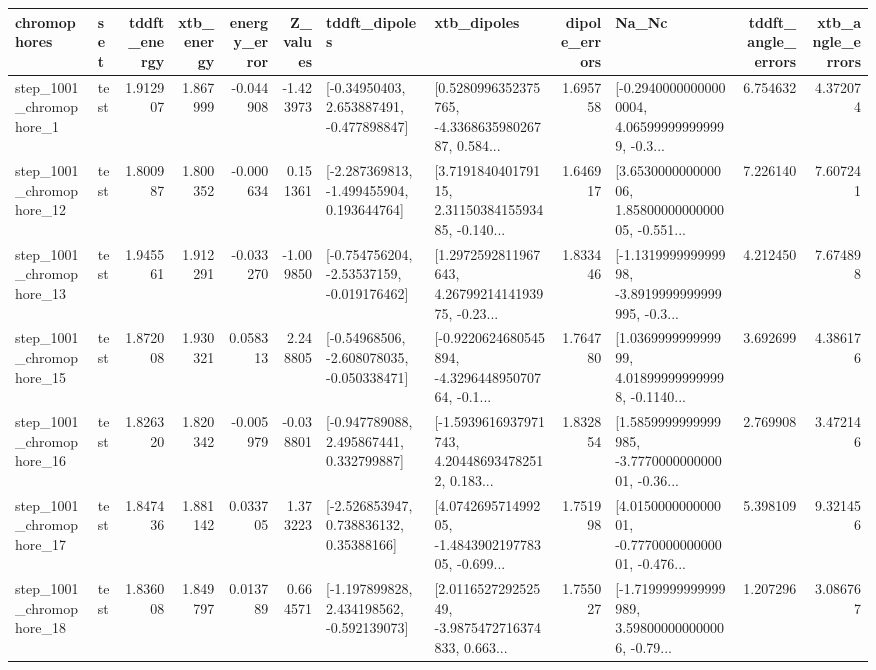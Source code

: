 \begin{tabular}{llrrrrllrlrr}
\toprule
             chromophores &       set &  tddft\_energy &  xtb\_energy &  energy\_error &  Z\_values &                               tddft\_dipoles &                                        xtb\_dipoles &  dipole\_errors &                                              Na\_Nc &  tddft\_angle\_errors &  xtb\_angle\_errors \\
\midrule
  step\_1001\_chromophore\_1 &      test &      1.912907 &    1.867999 &     -0.044908 & -1.423973 &    [-0.34950403, 2.653887491, -0.477898847] &  [0.5280996352375765, -4.336863598026787, 0.584... &       1.695758 &  [-0.29400000000000004, 4.065999999999999, -0.3... &            6.754632 &          4.372074 \\
 step\_1001\_chromophore\_12 &      test &      1.800987 &    1.800352 &     -0.000634 &  0.151361 &   [-2.287369813, -1.499455904, 0.193644764] &  [3.719184040179115, 2.3115038415593485, -0.140... &       1.646917 &  [3.653000000000006, 1.8580000000000005, -0.551... &            7.226140 &          7.607241 \\
 step\_1001\_chromophore\_13 &      test &      1.945561 &    1.912291 &     -0.033270 & -1.009850 &   [-0.754756204, -2.53537159, -0.019176462] &  [1.2972592811967643, 4.2679921414193975, -0.23... &       1.833446 &  [-1.131999999999998, -3.8919999999999995, -0.3... &            4.212450 &          7.674898 \\
 step\_1001\_chromophore\_15 &      test &      1.872008 &    1.930321 &      0.058313 &  2.248805 &   [-0.54968506, -2.608078035, -0.050338471] &  [-0.9220624680545894, -4.329644895070764, -0.1... &       1.764780 &  [1.036999999999999, 4.018999999999998, -0.1140... &            3.692699 &          4.386176 \\
 step\_1001\_chromophore\_16 &      test &      1.826320 &    1.820342 &     -0.005979 & -0.038801 &    [-0.947789088, 2.495867441, 0.332799887] &  [-1.5939616937971743, 4.204486934782512, 0.183... &       1.832854 &  [1.5859999999999985, -3.777000000000001, -0.36... &            2.769908 &          3.472146 \\
 step\_1001\_chromophore\_17 &      test &      1.847436 &    1.881142 &      0.033705 &  1.373223 &     [-2.526853947, 0.738836132, 0.35388166] &  [4.074269571499205, -1.484390219778305, -0.699... &       1.751998 &  [4.015000000000001, -0.777000000000001, -0.476... &            5.398109 &          9.321456 \\
 step\_1001\_chromophore\_18 &      test &      1.836008 &    1.849797 &      0.013789 &  0.664571 &   [-1.197899828, 2.434198562, -0.592139073] &  [2.011652729252549, -3.9875472716374833, 0.663... &       1.755027 &  [-1.7199999999999989, 3.598000000000006, -0.79... &            1.207296 &          3.086767 \\

\end{tabular}
